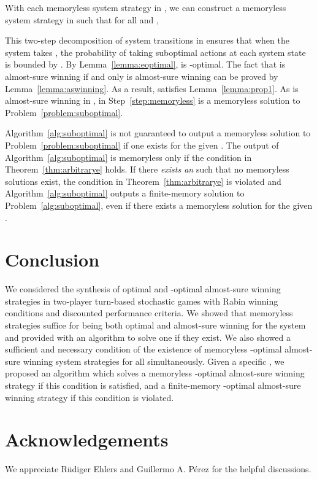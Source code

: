 \documentclass[runningheads,a4paper]{llncs}
\begin{document}
With each memoryless system strategy  in , we can construct a memoryless system strategy  in  such that for all  and , 

This two-step decomposition of system transitions in  ensures that when the system takes , the probability of taking suboptimal actions at each system state is bounded by .  
By Lemma~\ref{lemma:eoptimal},  is -optimal. The fact that  is almost-sure winning if and only  is almost-sure winning can be proved by Lemma~\ref{lemma:aswinning}. As a result,  satisfies Lemma~\ref{lemma:prop1}. As  is almost-sure winning in ,  in Step~\ref{step:memoryless} is a memoryless solution to Problem~\ref{problem:suboptimal}. 














\begin{remark}
Algorithm~\ref{alg:suboptimal} is not guaranteed to output a memoryless solution to Problem~\ref{problem:suboptimal} if one exists for the given . The output of Algorithm~\ref{alg:suboptimal} is memoryless only if the condition in Theorem~\ref{thm:arbitrarye} holds. If there \emph{exists an}  such that no memoryless solutions exist, the condition in Theorem~\ref{thm:arbitrarye} is violated and Algorithm~\ref{alg:suboptimal} outputs a finite-memory solution to Problem~\ref{alg:suboptimal}, even if there exists a memoryless solution for the given .
\end{remark}










\section{Conclusion}

We considered the synthesis of optimal and -optimal almost-sure winning strategies in two-player turn-based stochastic games with Rabin winning conditions and discounted performance criteria. We showed that memoryless strategies suffice for being both optimal and almost-sure winning for the system and provided with an algorithm to solve one if they exist. We also showed a sufficient and necessary condition of the existence of memoryless -optimal almost-sure winning system strategies for all  simultaneously. 
Given a specific , we proposed an algorithm which solves a memoryless -optimal almost-sure winning strategy if this condition is satisfied, and a finite-memory -optimal almost-sure winning strategy if this condition is violated. 






\section*{Acknowledgements}
We appreciate R{\"u}diger Ehlers and Guillermo A. P{\'e}rez for the helpful discussions. 



\end{document}

